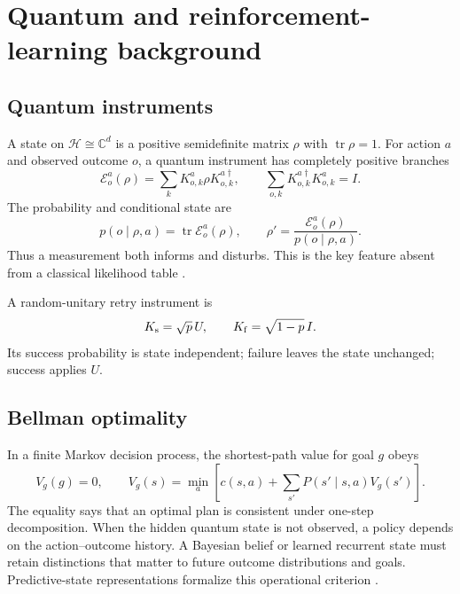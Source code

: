 \documentclass[11pt]{article}
\theoremstyle{definition}\newtheorem{definition}[theorem]{Definition}
\theoremstyle{remark}\newtheorem{remark}[theorem]{Remark}
\newcommand{\C}{\mathbb C}
\newcommand{\tr}{\operatorname{tr}}
\newcommand{\cE}{\mathcal E}
\begin{document}
\section{Quantum and reinforcement-learning background}
\label{sec:background}

\subsection{Quantum instruments}

A state on \(\mathcal H\cong\C^d\) is a positive semidefinite matrix \(\rho\)
with \(\tr\rho=1\). For action \(a\) and observed outcome \(o\), a quantum
instrument has completely positive branches
\begin{equation}
\cE_o^a(\rho)=\sum_kK_{o,k}^a\rho K_{o,k}^{a\dagger},
\qquad
\sum_{o,k}K_{o,k}^{a\dagger}K_{o,k}^a=I.
\label{eq:instrument}
\end{equation}
The probability and conditional state are
\begin{equation}
p(o\mid\rho,a)=\tr\cE_o^a(\rho),\qquad
\rho'=\frac{\cE_o^a(\rho)}{p(o\mid\rho,a)}.
\label{eq:born}
\end{equation}
Thus a measurement both informs and disturbs. This is the key feature absent
from a classical likelihood table \cite{kraus1983,nielsen2010,wiseman2010}.

A random-unitary retry instrument is
\begin{equation}
K_{\rm s}=\sqrt p\,U,\qquad K_{\rm f}=\sqrt{1-p}\,I.
\label{eq:retry}
\end{equation}
Its success probability is state independent; failure leaves the state
unchanged; success applies \(U\).

\subsection{Bellman optimality}

In a finite Markov decision process, the shortest-path value for goal \(g\)
obeys
\begin{equation}
V_g(g)=0,\qquad
V_g(s)=\min_a\left[c(s,a)+\sum_{s'}P(s'\mid s,a)V_g(s')\right].
\label{eq:bellman}
\end{equation}
The equality says that an optimal plan is consistent under one-step
decomposition. When the hidden quantum state is not observed, a policy depends
on the action--outcome history. A Bayesian belief or learned recurrent state
must retain distinctions that matter to future outcome distributions and
goals. Predictive-state representations formalize this operational criterion
\cite{littman2002}.
\end{document}
